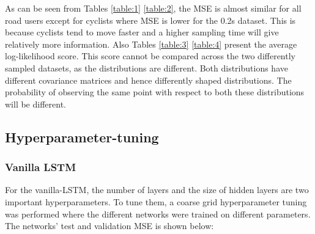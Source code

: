 \documentclass{article}
\begin{document}
As can be seen from Tables \ref{table:1} \ref{table:2}, the MSE is almost similar for all road users except for cyclists where MSE is lower for the 0.2s dataset. This is because cyclists tend to move faster and a higher sampling time will give relatively more information. Also Tables \ref{table:3} \ref{table:4} present the average log-likelihood score. This score cannot be compared across the two differently sampled datasets, as the distributions are different. Both distributions have different covariance matrices and hence differently shaped distributions. The probability of observing the same point with respect to both these distributions will be different. 
\subsection{Hyperparameter-tuning}
\subsubsection{Vanilla LSTM}
For the vanilla-LSTM, the number of layers and the size of hidden layers are two important hyperparameters. To tune them, a coarse grid hyperparameter tuning was performed where the different networks were trained on different parameters. The networks' test and validation MSE is shown below:
\end{document}
